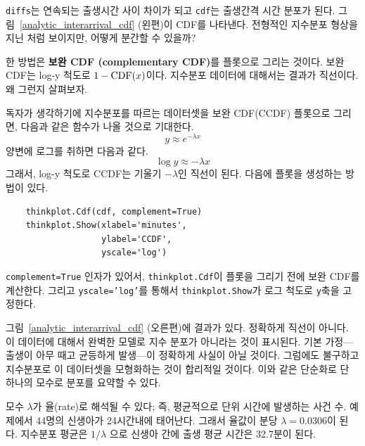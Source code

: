 
{\tt diffs}는 연속되는 출생시간 사이 차이가 되고 
{\tt cdf}는 출생간격 시간 분포가 된다.
그림~\ref{analytic_interarrival_cdf} (왼편)이 CDF를 나타낸다.
전형적인 지수분포 형상을 지닌 처럼 보이지만, 어떻게 분간할 수 있을까?

한 방법은 {\bf 보완 CDF (complementary CDF)}를 플롯으로 그리는 것이다.
보완 CDF는 log-y 척도로 $1 - \mathrm{CDF}(x)$이다.
지수분포 데이터에 대해서는 결과가 직선이다. 왜 그런지 살펴보자.


독자가 생각하기에 지수분포를 따르는 데이터셋을 보완 CDF(CCDF) 플롯으로 그리면, 
다음과 같은 함수가 나올 것으로 기대한다.
%
\[ y \approx e^{-\lambda x} \]
%
양변에 로그를 취하면 다음과 같다.
%
\[ \log y \approx -\lambda x\]
%
그래서, log-y 척도로 CCDF는 기울기 $-\lambda$인 직선이 된다.
다음에 플롯을 생성하는 방법이 있다.

\begin{verbatim}
    thinkplot.Cdf(cdf, complement=True)
    thinkplot.Show(xlabel='minutes',
                   ylabel='CCDF',
                   yscale='log')
\end{verbatim}

{\tt complement=True} 인자가 있어서, {\tt thinkplot.Cdf}이 플롯을 그리기 전에
보완 CDF를 계산한다. 그리고 {\tt yscale='log'}를 통해서  
{\tt thinkplot.Show}가 로그 척도로 {\tt y}축을 고정한다.

그림~\ref{analytic_interarrival_cdf} (오른편)에 결과가 있다.
정확하게 직선이 아니다. 이 데이터에 대해서 완벽한 모델로 지수 분포가 아니라는 것이 표시된다.
기본 가정---출생이 아무 때고 균등하게 발생---이 정확하게 사실이 아닐 것이다.
그럼에도 불구하고 지수분포로 이 데이터셋을 모형화하는 것이 합리적일 것이다.
이와 같은 단순화로 단 하나의 모수로 분포를 요약할 수 있다.

모수 $\lambda$가 율(rate)로 해석될 수 있다; 즉, 평균적으로 단위 시간에 
발생하는 사건 수. 예제에서 44명의 신생아가 24시간내에 태어난다.
그래서 율값이 분당 $\lambda = 0.0306$이 된다.
지수분포 평균은 $1/\lambda$ 으로 신생아 간에 출생 평균 시간은 32.7분이 된다.

